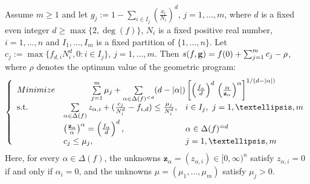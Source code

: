\documentclass[10pt,a4paper]{amsart}
\begin{document}
\begin{thm} \label{the algorithm} Assume $m\ge 1$ and let $g_j := 1-\sum_{i\in I_j} (\frac{x_i}{N_i})^d$, $j=1,\dots,m$, where $d$ is a fixed even integer $d \ge \max\{ 2, \deg(f)\}$, $N_i$ is a fixed positive real number, $i=1,\dots, n$ and  $I_1,\dots, I_m$ is a fixed partition of $\{ 1,\dots,n\}$. Let $c_j := \max\{ f_{d,i}N_i^d, 0 : i \in I_j\}$,  $j=1,\dots, m.$ Then $s(f,{\bf g}) = f(0)+\sum_{j=1}^m c_j - \rho$, where $\rho$ denotes the optimum value of the geometric program:
\begin{equation}
\label{lw3}
\left\{\begin{array}{lll}
	\textrm{Minimize} & \multicolumn{2}{c}{\sum\limits_{j=1}^m \mu_j+ \sum\limits_{\alpha\in\Delta(f)^{<d}}(d-\vert\alpha\vert)\left[
	 \left(\frac{f_\alpha}{d}\right)^{d}\,\left(\frac{\alpha}{\mathbf{z}_\alpha}\right)^\alpha
	\right]^{1/(d-\vert\alpha\vert)}}\\
	\textrm{\mbox{s.t.}} & \sum\limits_{\alpha\in\Delta(f)}z_{\alpha,i}+(\frac{c_j}{N_i^d}-f_{i,d}) \le \frac{\mu_j}{N_i^d}, & i \in I_j, \ j=1,\ldots,m\\
	& \left(\frac{\mathbf{z}_\alpha}{\alpha}\right)^\alpha = \left(\frac{f_\alpha}{d}\right)^{d}, & \alpha\in\Delta(f)^{=d}\\
	& c_j \le \mu_j, & j=1,\dots,m
\end{array}\right.
\end{equation}
%
Here, for every $\alpha\in\Delta(f)$, the unknowns $\mathbf{z}_\alpha = (z_{\alpha,i})\in[0,\infty)^n$ satisfy $z_{\alpha,i}= 0$ if and only if $\alpha_i=0$, and the unknowns $\mu = (\mu_1,\dots,\mu_m)$ satisfy $\mu_j> 0$.
\end{thm}
\end{document}
